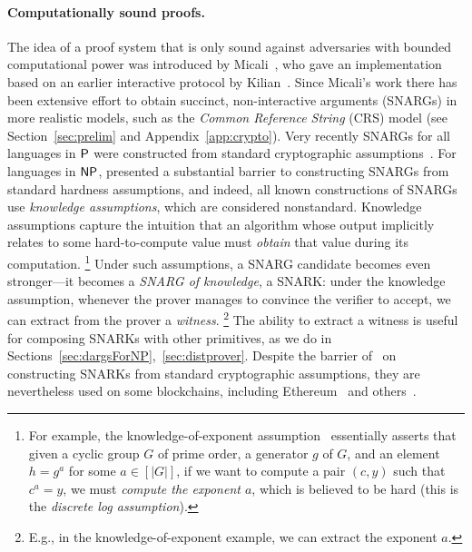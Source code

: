\paragraph{Computationally sound proofs.}
The idea of a proof system that is only sound against adversaries with bounded computational power
was introduced by Micali~\cite{micali2000computationally},
who gave an implementation 
based on an earlier interactive protocol by Kilian~\cite{kilian1992note}.
Since Micali's work
there has been extensive effort to obtain succinct, non-interactive arguments (SNARGs) in more realistic models, such as the \emph{Common Reference String} (CRS) model (see Section~\ref{sec:prelim} and Appendix~\ref{app:crypto}).
Very recently SNARGs for all languages in ${\mathsf{P}}$ were constructed from standard cryptographic assumptions~\cite{kalai2019delegate, jawale2021snargs, choudhuri2021snargs, cryptoeprint:2022/1320}. For languages in ${\mathsf{NP}}$, \cite{gentry2011separating} presented a substantial barrier to constructing SNARGs from standard hardness assumptions, and indeed, all known constructions of SNARGs use \emph{knowledge assumptions}, which are considered nonstandard.
%
Knowledge assumptions capture the intuition that an algorithm whose output implicitly relates to some
hard-to-compute value must \emph{obtain} that value during its computation.%
\footnote{For example, 
the knowledge-of-exponent assumption~\cite{KOE}
essentially asserts that given a cyclic group $G$ of prime order,
a generator $g$ of $G$, and an element $h = g^a$ for some $a \in [|G|]$,
if we want to compute a pair $(c,y)$ such that $c^a = y$,
we must \emph{compute the exponent $a$}, which is believed to be hard (this is the \emph{discrete log assumption}).}
Under such assumptions, a SNARG candidate becomes even stronger---it becomes
a \emph{SNARG of knowledge}, a SNARK:
under the knowledge assumption, whenever the prover manages to convince the verifier to accept,
we can extract from the prover a \emph{witness}.%
\footnote{E.g., in the knowledge-of-exponent example, we can extract the exponent $a$.}
The ability to extract a witness is useful for composing SNARKs with other primitives,
as we do in Sections~\ref{sec:dargsForNP},~\ref{sec:distprover}.
Despite the barrier of~\cite{gentry2011separating} on constructing
SNARKs from standard cryptographic assumptions, they are 
nevertheless used on some blockchains, including Ethereum~\cite{ZKSnarks} and others~\cite{filecoin,Zcash,Starkware}.
